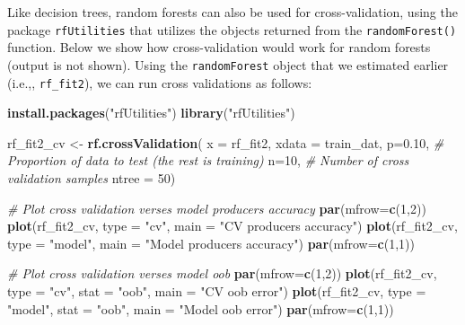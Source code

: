 \documentclass[]{book}
\newenvironment{Shaded}{\begin{snugshade}}{\end{snugshade}}
\newcommand{\CommentTok}[1]{\textcolor[rgb]{0.56,0.35,0.01}{\textit{#1}}}
\newcommand{\DataTypeTok}[1]{\textcolor[rgb]{0.13,0.29,0.53}{#1}}
\newcommand{\DecValTok}[1]{\textcolor[rgb]{0.00,0.00,0.81}{#1}}
\newcommand{\FloatTok}[1]{\textcolor[rgb]{0.00,0.00,0.81}{#1}}
\newcommand{\KeywordTok}[1]{\textcolor[rgb]{0.13,0.29,0.53}{\textbf{#1}}}
\newcommand{\NormalTok}[1]{#1}
\newcommand{\StringTok}[1]{\textcolor[rgb]{0.31,0.60,0.02}{#1}}
\begin{document}
Like decision trees, random forests can also be used for cross-validation, using the package \texttt{rfUtilities} that utilizes the objects returned from the \texttt{randomForest()} function. Below we show how cross-validation would work for random forests (output is not shown). Using the \texttt{randomForest} object that we estimated earlier (i.e.,, \texttt{rf\_fit2}), we can run cross validations as follows:

\begin{Shaded}
\begin{Highlighting}[]
\KeywordTok{install.packages}\NormalTok{(}\StringTok{"rfUtilities"}\NormalTok{)}
\KeywordTok{library}\NormalTok{(}\StringTok{"rfUtilities"}\NormalTok{)}

\NormalTok{rf_fit2_cv <-}\StringTok{ }\KeywordTok{rf.crossValidation}\NormalTok{(}
  \DataTypeTok{x =}\NormalTok{ rf_fit2, }
  \DataTypeTok{xdata =}\NormalTok{ train_dat,}
  \DataTypeTok{p=}\FloatTok{0.10}\NormalTok{, }\CommentTok{# Proportion of data to test (the rest is training)}
  \DataTypeTok{n=}\DecValTok{10}\NormalTok{,   }\CommentTok{# Number of cross validation samples}
  \DataTypeTok{ntree =} \DecValTok{50}\NormalTok{)   }


\CommentTok{# Plot cross validation verses model producers accuracy}
\KeywordTok{par}\NormalTok{(}\DataTypeTok{mfrow=}\KeywordTok{c}\NormalTok{(}\DecValTok{1}\NormalTok{,}\DecValTok{2}\NormalTok{)) }
\KeywordTok{plot}\NormalTok{(rf_fit2_cv, }\DataTypeTok{type =} \StringTok{"cv"}\NormalTok{, }\DataTypeTok{main =} \StringTok{"CV producers accuracy"}\NormalTok{)}
\KeywordTok{plot}\NormalTok{(rf_fit2_cv, }\DataTypeTok{type =} \StringTok{"model"}\NormalTok{, }\DataTypeTok{main =} \StringTok{"Model producers accuracy"}\NormalTok{)}
\KeywordTok{par}\NormalTok{(}\DataTypeTok{mfrow=}\KeywordTok{c}\NormalTok{(}\DecValTok{1}\NormalTok{,}\DecValTok{1}\NormalTok{)) }

\CommentTok{# Plot cross validation verses model oob}
\KeywordTok{par}\NormalTok{(}\DataTypeTok{mfrow=}\KeywordTok{c}\NormalTok{(}\DecValTok{1}\NormalTok{,}\DecValTok{2}\NormalTok{)) }
\KeywordTok{plot}\NormalTok{(rf_fit2_cv, }\DataTypeTok{type =} \StringTok{"cv"}\NormalTok{, }\DataTypeTok{stat =} \StringTok{"oob"}\NormalTok{, }\DataTypeTok{main =} \StringTok{"CV oob error"}\NormalTok{)}
\KeywordTok{plot}\NormalTok{(rf_fit2_cv, }\DataTypeTok{type =} \StringTok{"model"}\NormalTok{, }\DataTypeTok{stat =} \StringTok{"oob"}\NormalTok{, }\DataTypeTok{main =} \StringTok{"Model oob error"}\NormalTok{)    }
\KeywordTok{par}\NormalTok{(}\DataTypeTok{mfrow=}\KeywordTok{c}\NormalTok{(}\DecValTok{1}\NormalTok{,}\DecValTok{1}\NormalTok{)) }
\end{Highlighting}
\end{Shaded}
\end{document}
